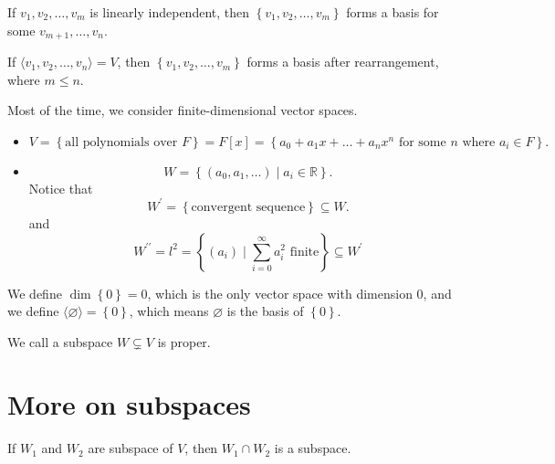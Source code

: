\begin{corollary}
    If \(v_1, v_2, \dots , v_m\) is linearly independent, then \(\left\{ v_1, v_2, \dots , v_m \right\} \) forms a basis for some \(v_{m+1}, \dots , v_n\).  
\end{corollary}

\begin{theorem} \label{thm: srhink basis}
    If \(\langle v_1, v_2, \dots , v_n \rangle = V \), then \(\left\{ v_1, v_2, \dots , v_m \right\} \) forms a basis after rearrangement, where \(m \le n\).  
\end{theorem}

\begin{remark}
    Most of the time, we consider finite-dimensional vector spaces.
\end{remark}

\begin{remark}
    \vphantom{text}
    \begin{itemize}
        \item     \[
        V = \left\{ \text{all polynomials over } F \right\} = F[x] = \left\{ a_0 + a_1 x + \dots + a_n x^n \text{ for some } n \text{ where } a_i \in F\right\}. 
    \]
        \item
    \[
        W = \left\{ (a_0, a_1, \dots ) \mid a_i \in \mathbb{R}  \right\}. 
    \]
    Notice that 
    \[
         W^{\prime} = \left\{ \text{convergent sequence} \right\} \subseteq W. 
    \] and 
    \[
        W^{\prime\prime}  = l^2 = \left\{ (a_i) \mid \sum_{i=0}^{\infty} a_i^2 \text{ finite}  \right\} \subseteq W^{\prime} 
    \]
    \end{itemize}
\end{remark}

\begin{remark}
    We define \(\dim \left\{ 0 \right\} = 0 \), which is the only vector space with dimension \(0\), and we define \(\langle \varnothing  \rangle = \left\{ 0 \right\}\), which means \(\varnothing \) is the basis of \(\left\{ 0 \right\} \).  
\end{remark}

\begin{note}
    We call a subspace \(W \subsetneq V\) is proper. 
\end{note}

\section{More on subspaces}
\begin{theorem} \label{thm: intersection of subspace is subspace}
    If \(W_1\) and \(W_2\) are subspace of \(V\), then \(W_1 \cap W_2\) is a subspace.    
\end{theorem}

